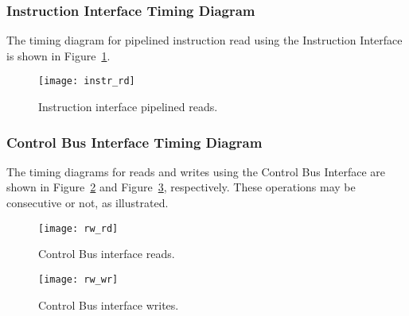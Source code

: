\subsubsection{Instruction Interface Timing Diagram}
\label{sec:instrird}

The timing diagram for pipelined instruction read using the
Instruction Interface is shown in Figure~\ref{fig:instrird}.

\begin{figure}[htbp]
    \centerline{\texttt{[image: instr\_rd]}}
    \vspace{0cm}\caption{Instruction interface pipelined reads.}
    \label{fig:instrird}
\end{figure}

\subsubsection{Control Bus Interface Timing Diagram}
\label{sec:rwi}

The timing diagrams for reads and writes using the Control Bus Interface
are shown in Figure~\ref{fig:rwird} and Figure~\ref{fig:rwiwr},
respectively. These operations may be consecutive or not, as
illustrated.

\begin{figure}[htbp]
    \centerline{\texttt{[image: rw\_rd]}}
    \vspace{0cm}\caption{Control Bus interface reads.}
    \label{fig:rwird}
\end{figure}

\begin{figure}[htbp]
    \centerline{\texttt{[image: rw\_wr]}}
    \vspace{0cm}\caption{Control Bus interface writes.}
    \label{fig:rwiwr}
\end{figure}

